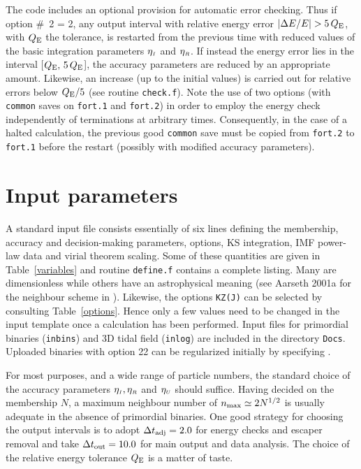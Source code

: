 \documentclass[12pt]{article}
\begin{document}
The code includes an optional provision for automatic error checking.
Thus if option \#~2 = 2, any output interval with relative energy error
$\vert \Delta E / E \vert > 5 \,Q_{\rm E}$, with $Q_{\rm E}$ the tolerance,
is restarted from the previous time with reduced values of the basic
integration parameters $\eta_{\scriptscriptstyle I}$ and $\eta_{\scriptscriptstyle R}$.
If instead the energy error lies in the interval
[$Q_{\rm E},\, 5\,Q_{\rm E}$], the accuracy parameters are reduced by an
appropriate amount.
Likewise, an increase (up to the initial values) is carried out for relative
errors below $Q_{\rm E} / 5$ (see routine {\tt check.f}).
Note the use of two options (with {\tt common} saves on {\tt fort.1} and
{\tt fort.2}) in order to employ the energy check independently of
terminations at arbitrary times.
Consequently, in the case of a halted calculation, the previous good
{\tt common} save must be copied from {\tt fort.2} to {\tt fort.1} before 
the restart (possibly with modified accuracy parameters).

\section{Input parameters}

A standard input file consists essentially of six lines defining the
membership, accuracy and decision-making parameters, options, KS
integration, IMF power-law data and virial theorem scaling.
Some of these quantities are given in Table~\ref{variables} and
routine {\tt define.f} contains a complete listing.
Many are dimensionless while others have an astrophysical meaning
(see Aarseth 2001a for the neighbour scheme in {}).
Likewise, the options {\tt KZ(J)} can be selected by consulting
Table~\ref{options}.
Hence only a few values need to be changed in the input template once a
calculation has been performed.
Input files for primordial binaries ({\tt inbins}) and 3D tidal field
({\tt inlog}) are included in the directory {\tt Docs}.
Uploaded binaries with option 22 can be regularized initially by
specifying {}.

For most purposes, and a wide range of particle numbers, the standard choice
of the accuracy parameters $\eta_{\scriptscriptstyle I}, \eta_{\scriptscriptstyle R}$ and $\eta_{\scriptscriptstyle U}$ should suffice.
Having decided on the membership $N$, a maximum neighbour number of
$n_{\rm max} \simeq 2 N^{1/2}$ is usually adequate in the absence of
primordial binaries.
One good strategy for choosing the output intervals is to adopt
$\Delta t_{\rm adj} = 2.0$ for energy checks and escaper removal and take
$\Delta t_{\rm out} = 10.0$ for main output and data analysis.
The choice of the relative energy tolerance $Q_{\rm E}$ is a matter of
taste.
\end{document}
